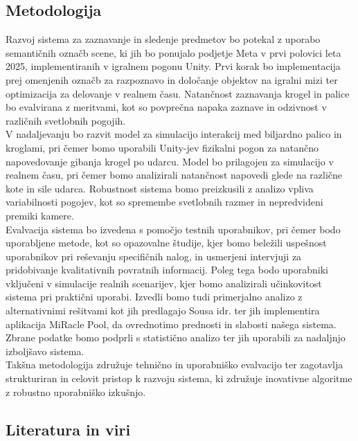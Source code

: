 \documentclass[a4paper, 12pt]{article}
\begin{document}
\subsection{Metodologija}
Razvoj sistema za zaznavanje in sledenje predmetov bo potekal z uporabo semantičnih označb scene, ki jih bo ponujalo podjetje Meta v prvi polovici leta 2025, implementiranih v igralnem pogonu Unity. Prvi korak bo implementacija prej omenjenih označb za razpoznavo in določanje objektov na igralni mizi ter optimizacija za delovanje v realnem času. Natančnost zaznavanja krogel in palice bo evalvirana z meritvami, kot so povprečna napaka zaznave in odzivnost v različnih svetlobnih pogojih.
\\
V nadaljevanju bo razvit model za simulacijo interakcij med biljardno palico in kroglami, pri čemer bomo uporabili Unity-jev fizikalni pogon za natančno napovedovanje gibanja krogel po udarcu. Model bo prilagojen za simulacijo v realnem času, pri čemer bomo analizirali natančnost napovedi glede na različne kote in sile udarca. Robustnost sistema bomo preizkusili z analizo vpliva variabilnosti pogojev, kot so spremembe svetlobnih razmer in nepredvideni premiki kamere.
\\
Evalvacija sistema bo izvedena s pomočjo testnih uporabnikov, pri čemer bodo uporabljene metode, kot so opazovalne študije, kjer bomo beležili uspešnost uporabnikov pri reševanju specifičnih nalog, in usmerjeni intervjuji za pridobivanje kvalitativnih povratnih informacij. Poleg tega bodo uporabniki vključeni v simulacije realnih scenarijev, kjer bomo analizirali učinkovitost sistema pri praktični uporabi. Izvedli bomo tudi primerjalno analizo z alternativnimi rešitvami kot jih predlagajo Sousa idr. ter jih implementira aplikacija MiRacle Pool, da ovrednotimo prednosti in slabosti našega sistema. Zbrane podatke bomo podprli s statistično analizo ter jih uporabili za nadaljnjo izboljšavo sistema.
\\
Takšna metodologija združuje tehnično in uporabniško evalvacijo ter zagotavlja strukturiran in celovit pristop k razvoju sistema, ki združuje inovativne algoritme z robustno uporabniško izkušnjo.
\newpage
\subsection{Literatura in viri}
\label{literatura}
\renewcommand\refname{}
\vspace{-50px}


\end{document}
